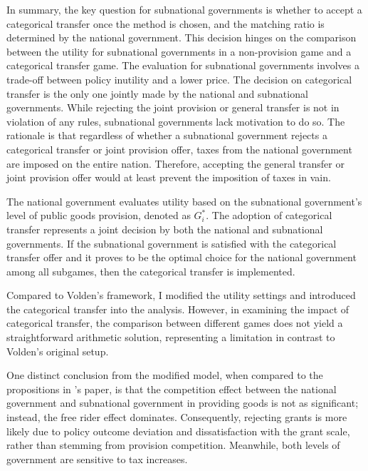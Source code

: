 \documentclass[man]{apa7}
\begin{document}
In summary, the key question for subnational governments is whether to accept a categorical transfer once the method is chosen, and the matching ratio is determined by the national government. This decision hinges on the comparison between the utility for subnational governments in a non-provision game and a categorical transfer game. The evaluation for subnational governments involves a trade-off between policy inutility and a lower price. The decision on categorical transfer is the only one jointly made by the national and subnational governments. While rejecting the joint provision or general transfer is not in violation of any rules, subnational governments lack motivation to do so. The rationale is that regardless of whether a subnational government rejects a categorical transfer or joint provision offer, taxes from the national government are imposed on the entire nation. Therefore, accepting the general transfer or joint provision offer would at least prevent the imposition of taxes in vain. %

The national government evaluates utility based on the subnational government's level of public goods provision, denoted as $G_i^*$. The adoption of categorical transfer represents a joint decision by both the national and subnational governments. If the subnational government is satisfied with the categorical transfer offer and it proves to be the optimal choice for the national government among all subgames, then the categorical transfer is implemented.

Compared to Volden's framework, I modified the utility settings and introduced the categorical transfer into the analysis. However, in examining the impact of categorical transfer, the comparison between different games does not yield a straightforward arithmetic solution, representing a limitation in contrast to Volden's original setup.%

One distinct conclusion from the modified model, when compared to the propositions in \Textcite{volden2007intergovernmental}'s paper, is that the competition effect between the national government and subnational government in providing goods is not as significant; instead, the free rider effect dominates. Consequently, rejecting grants is more likely due to policy outcome deviation and dissatisfaction with the grant scale, rather than stemming from provision competition. Meanwhile, both levels of government are sensitive to tax increases.%
\end{document}
